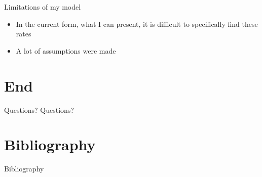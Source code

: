\documentclass[aspectratio=169,  notheorems, sOuRcEs]{RUCPresentation}
\begin{document}
\begin{frame}{Limitations of my model}

    \begin{itemize}
        \item In the current form, what I can present,
            it is difficult to specifically find these rates
        \item A lot of assumptions were made
    \end{itemize}


\end{frame}




\section{End}
\begin{frame}{Questions?}
    \large Questions?
\end{frame}


\section{Bibliography}
\begin{frame}{Bibliography}

    \printbibliography

\end{frame}
\end{document}
